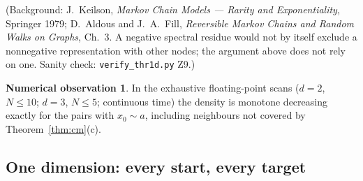 \documentclass[11pt,a4paper]{article}
\theoremstyle{definition}
\newtheorem{observation}[theorem]{Numerical observation}
\begin{document}
(Background: J.~Keilson, \emph{Markov Chain Models --- Rarity and Exponentiality}, Springer 1979; D.~Aldous and J.~A.~Fill, \emph{Reversible Markov Chains and Random Walks on Graphs}, Ch.~3. A negative spectral residue would not by itself exclude a nonnegative representation with other nodes; the argument above does not rely on one. Sanity check: \texttt{verify\_thr1d.py} Z9.)

\begin{observation}\label{obs:adjacent}
In the exhaustive floating-point scans ($d=2$, $N\le10$; $d=3$, $N\le5$; continuous time) the density is monotone decreasing exactly for the pairs with $x_0\sim a$, including neighbours not covered by Theorem~\ref{thm:cm}(c).
\end{observation}

\subsection{One dimension: every start, every target}
\end{document}
